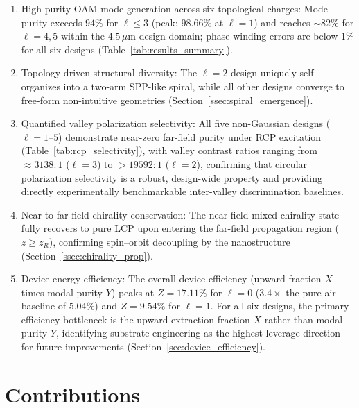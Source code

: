\begin{enumerate}

\item High-purity OAM mode generation across six topological charges: Mode purity exceeds $94\%$ for $\ell \le 3$ (peak: $98.66\%$ at $\ell = 1$) and reaches $\sim\!82\%$ for $\ell = 4, 5$ within the $4.5\,\mu$m design domain; phase winding errors are below $1\%$ for all six designs (Table~\ref{tab:results_summary}).

\item Topology-driven structural diversity: The $\ell = 2$ design uniquely self-organizes into a two-arm SPP-like spiral, while all other designs converge to free-form non-intuitive geometries (Section~\ref{ssec:spiral_emergence}).

\item Quantified valley polarization selectivity: All five non-Gaussian designs ($\ell = 1$--$5$) demonstrate near-zero far-field purity under RCP excitation (Table~\ref{tab:rcp_selectivity}), with valley contrast ratios ranging from $\approx 3138{:}1$ ($\ell = 3$) to ${>}19592{:}1$ ($\ell = 2$), confirming that circular polarization selectivity is a robust, design-wide property and providing directly experimentally benchmarkable inter-valley discrimination baselines.

\item Near-to-far-field chirality conservation: The near-field mixed-chirality state fully recovers to pure LCP upon entering the far-field propagation region ($z \ge z_R$), confirming spin--orbit decoupling by the nanostructure (Section~\ref{ssec:chirality_prop}).

\item Device energy efficiency: The overall device efficiency (upward fraction $X$ times modal purity $Y$) peaks at $Z = 17.11\%$ for $\ell = 0$ ($3.4\times$ the pure-air baseline of $5.04\%$) and $Z = 9.54\%$ for $\ell = 1$. For all six designs, the primary efficiency bottleneck is the upward extraction fraction $X$ rather than modal purity $Y$, identifying substrate engineering as the highest-leverage direction for future improvements (Section~\ref{sec:device_efficiency}).

\end{enumerate}


\section{Contributions}
\label{sec:significance}

